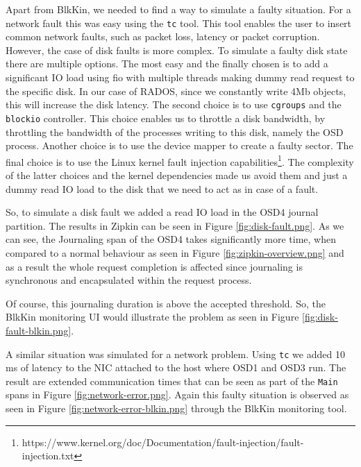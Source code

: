 Apart from BlkKin, we needed to find a way to simulate a faulty situation. For a
network fault this was easy using the \texttt{tc} tool. This tool enables the
user to insert common network faults, such as packet loss, latency or packet
corruption.  However, the case of disk faults is more complex. To simulate a
faulty disk state there are multiple options. The most easy and the finally
chosen is to add a significant IO load using fio with multiple threads making
dummy read request to the specific disk. In our case of RADOS, since we
constantly write 4Mb objects, this will increase the disk latency. The second
choice is to use \texttt{cgroups} and the \texttt{blockio} controller. This
choice enables us to throttle a disk bandwidth, by throttling the bandwidth of
the processes writing to this disk, namely the OSD process. Another choice is to
use the device mapper to create a faulty sector. The final choice is to use the
Linux kernel fault injection
capabilities\footnote{https://www.kernel.org/doc/Documentation/fault-injection/fault-injection.txt}.
The complexity of the latter choices and the kernel dependencies made us avoid
them and just a dummy read IO load to the disk that we need to act as in case of
a fault.

So, to simulate a disk fault we added a read IO load in the OSD4 journal
partition. The results in Zipkin can be seen in Figure \ref{fig:disk-fault.png}.
As we can see, the Journaling span of the OSD4 takes significantly more time,
when compared to a normal behaviour as seen in Figure
\ref{fig:zipkin-overview.png} and as a result the whole request completion is
affected since journaling is synchronous and encapsulated within the request
process. 


Of course, this journaling duration is above the accepted threshold. So, the
BlkKin monitoring UI would illustrate the problem as seen in Figure
\ref{fig:disk-fault-blkin.png}.


A similar situation was simulated for a network problem. Using \texttt{tc} we
added 10 ms of latency to the NIC attached to the host where OSD1 and OSD3 run.
The result are extended communication times that can be seen as part of the
\texttt{Main} spans in Figure \ref{fig:network-error.png}. Again this faulty
situation is observed as seen in Figure \ref{fig:network-error-blkin.png}
through the BlkKin monitoring tool.

